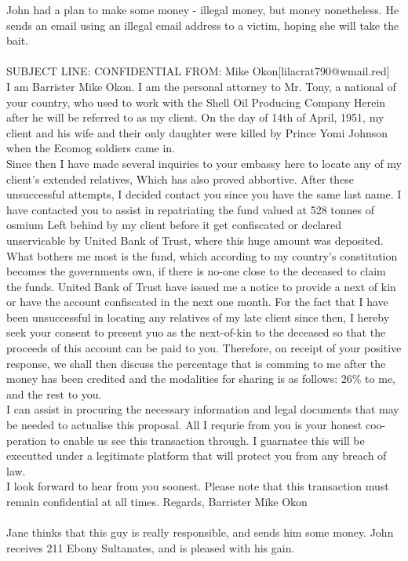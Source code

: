 \documentclass{article}
\begin{document}
John had a plan to make some money {-} illegal money, but money nonetheless.
He sends an email using an illegal email address to a victim, hoping she will take the bait.
\\\\
SUBJECT LINE: CONFIDENTIAL
FROM: Mike Okon[lilacrat790@wmail.red]
\\
I am Barrister Mike Okon.
I am the personal attorney to Mr. Tony, a national of your country, who used to work with the Shell Oil Producing Company
Herein after he will be referred to as my client.
On the day of 14th of April, 1951, my client and his wife and their only daughter were killed by Prince Yomi Johnson when the Ecomog soldiers came in.
\\
Since then I have made several inquiries to your embassy here to locate any of my client's extended relatives, Which has also proved abbortive.
After these unsuccessful attempts, I decided contact you since you have the same last name.
I have contacted you to assist in repatriating the fund valued at 528 tonnes of osmium Left behind by my client before it get confiscated or declared unservicable by United Bank of Trust, where this huge amount was deposited.
\\
What bothers me most is the fund, which according to my country's constitution becomes the governments own, if there is no{-}one close to the deceased to claim the funds.
United Bank of Trust have issued me a notice to provide a next of kin or have the account confiscated in the next one month.
For the fact that I have been unsuccessful in locating any relatives of my late client since then, I hereby seek your consent to present yuo as the next{-}of{-}kin to the deceased so that the proceeds of this account can be paid to you.
Therefore, on receipt of your positive response, we shall then discuss the percentage that is comming to me after the money has been credited and the modalities for sharing is as follows: 26\% to me, and the rest to you.
\\
I can assist in procuring the necessary information and legal documents that may be needed to actualise this proposal.
All I requrie from you is your honest coo{-}peration to enable us see this transaction through.
I guarnatee this will be executted under a legitimate platform that will protect you from any breach of law.
\\
I look forward to hear from you soonest.
Please note that this transaction must remain confidential at all times.
Regards, Barrister Mike Okon
\\\\
Jane thinks that this guy is really responsible, and sends him some money.
John receives 211 Ebony Sultanates, and is pleased with his gain.
\end{document}
